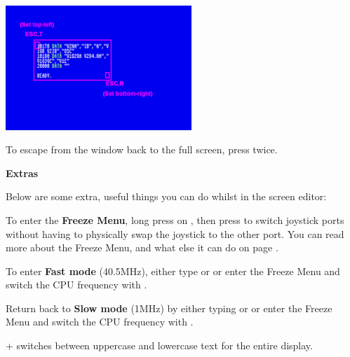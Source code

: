 \begin{center}
\includegraphics[width={7cm}]{images/set-window.png}
\end{center}

To escape from the window back to the full screen, press  twice.


\textbf{Extras}

Below are some extra, useful things you can do whilst in the screen editor:

  To enter the \textbf{Freeze Menu}, long press on , then press  to switch joystick ports without 
having to physically swap the joystick to the other port. You can read more about the Freeze Menu, and what else it can do
on page \pageref{sec:freezer}.

  To enter \textbf{Fast mode} (40.5MHz), either type  or  or enter the Freeze Menu and switch the CPU frequency with .

  Return back to \textbf{Slow mode} (1MHz) by either typing  or  or enter the Freeze Menu and switch the CPU frequency with .

  \megasymbolkey +  switches between uppercase and lowercase text for the entire display.
